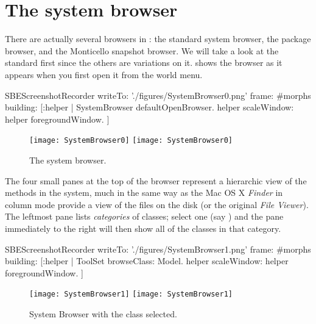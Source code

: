 \documentclass[a4paper,10pt,twoside]{book}
\begin{document}
\section{The system browser}
\label{sec:browser} %

There are actually several browsers in \sq: the standard system browser, the package browser, and the Monticello snapshot browser.
We will take a look at the standard  first since the others are variations on it.
 shows the browser as it appears when you first open it from the world menu.

\begin{ExecuteSmalltalkScript}
SBEScreenshotRecorder writeTo: './figures/SystemBrowser0.png' frame: #morphs building: [:helper |
	SystemBrowser defaultOpenBrowser.
	helper scaleWindow: helper foregroundWindow.
]
\end{ExecuteSmalltalkScript}
\begin{figure}[htbp]
   \centering
   \ifluluelse
	 {\texttt{[image: SystemBrowser0]} }
	 {\texttt{[image: SystemBrowser0]} }
   \caption{The system browser.}
   \label{fig:SystemBrowser0}
\end{figure}

The four small panes at the top of the browser represent a hierarchic view of the methods in the system, much in the same way as the Mac OS X \textit{Finder} in column mode provide a view of the files on the disk (or the original  \textit{File Viewer}).
The leftmost pane lists \emph{categories} of classes; select one (say ) and the pane immediately to the right will then show all of the classes in that category.

\begin{ExecuteSmalltalkScript}
SBEScreenshotRecorder writeTo: './figures/SystemBrowser1.png' frame: #morphs building: [:helper |
	ToolSet browseClass: Model.
	helper scaleWindow: helper foregroundWindow.
]
\end{ExecuteSmalltalkScript}
\begin{figure}[htbp]
   \centering
   \ifluluelse
	   {\texttt{[image: SystemBrowser1]} }
	   {\texttt{[image: SystemBrowser1]} }
   \caption{System Browser with the class  selected.
   \label{fig:SystemBrowserModel}}
\end{figure}
\end{document}

